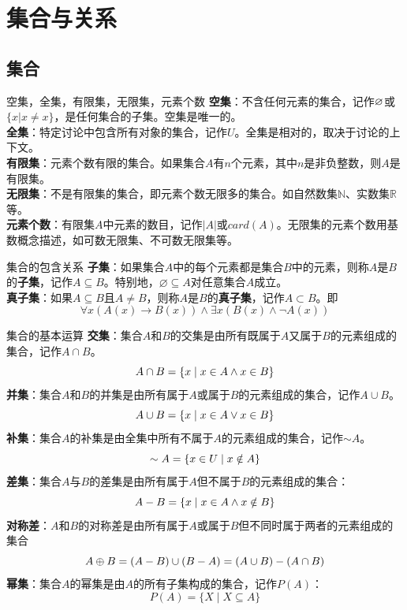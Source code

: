 \chapter{集合与关系}
\section{集合}
\begin{definition}{空集，全集，有限集，无限集，元素个数}{}
\textbf{空集}：不含任何元素的集合，记作$\varnothing$或$\{x|x\ne x\}$，是任何集合的子集。空集是唯一的。\\
\textbf{全集}：特定讨论中包含所有对象的集合，记作$U$。全集是相对的，取决于讨论的上下文。\\
\textbf{有限集}：元素个数有限的集合。如果集合$A$有$n$个元素，其中$n$是非负整数，则$A$是有限集。\\
\textbf{无限集}：不是有限集的集合，即元素个数无限多的集合。如自然数集$\mathbb{N}$、实数集$\mathbb{R}$等。\\
\textbf{元素个数}：有限集$A$中元素的数目，记作$|A|$或$card(A)$。无限集的元素个数用基数概念描述，如可数无限集、不可数无限集等。
\end{definition}
\begin{definition}{集合的包含关系}{}
    \textbf{子集}：如果集合$A$中的每个元素都是集合$B$中的元素，则称$A$是$B$的\textbf{子集}，记作$A \subseteq B$。特别地，$\varnothing\subseteq A$对任意集合$A$成立。\\
    \textbf{真子集}：如果$A \subseteq B$且$A \neq B$，则称$A$是$B$的\textbf{真子集}，记作$A \subset B$。即\vspace{-10pt}
    \[\forall x(A(x) \rightarrow B(x)) \land \exists x(B(x) \land \neg A(x))\]
\end{definition}
\begin{definition}{集合的基本运算}{}
\textbf{交集}：集合$A$和$B$的交集是由所有既属于$A$又属于$B$的元素组成的集合，记作$A \cap B$。\vspace{-10pt}
$$A \cap B = \{x \mid x \in A \land x \in B\}\vspace{-10pt}$$
\textbf{并集}：集合$A$和$B$的并集是由所有属于$A$或属于$B$的元素组成的集合，记作$A \cup B$。\vspace{-10pt}
$$A \cup B = \{x \mid x \in A \lor x \in B\}\vspace{-10pt}$$
\textbf{补集}：集合$A$的补集是由全集中所有不属于$A$的元素组成的集合，记作$\sim  A$。\vspace{-10pt}
$$\sim A = \{x \in U \mid x \notin A\}\vspace{-10pt}$$
\textbf{差集}：集合$A$与$B$的差集是由所有属于$A$但不属于$B$的元素组成的集合：\vspace{-10pt}
$$A-B = \{x \mid x \in A \land x \notin B\}\vspace{-10pt}$$
\textbf{对称差}：$A$和$B$的对称差是由所有属于$A$或属于$B$但不同时属于两者的元素组成的集合\vspace{-10pt}
$$A\oplus B = (A - B) \cup (B -A) = (A \cup B)- (A \cap B)\vspace{-10pt}$$
\textbf{幂集}：集合$A$的幂集是由$A$的所有子集构成的集合，记作$P(A)$：\vspace{-10pt}
$$P(A) = \{X \mid X \subseteq A\}$$
\end{definition}
